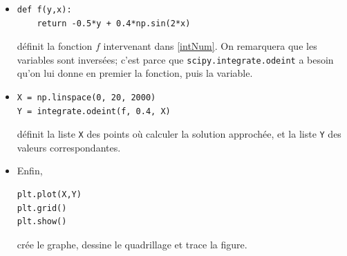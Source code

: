 \documentclass[../main.tex]{subfiles}
\begin{document}
\begin{exe}
\begin{itemize}
	\item \begin{verbatim}
def f(y,x):
    return -0.5*y + 0.4*np.sin(2*x)
	\end{verbatim}
	définit la fonction $f$ intervenant dans \eqref{intNum}. On remarquera que les variables sont inversées; c'est parce que \texttt{scipy.integrate.odeint} a besoin qu'on lui donne en premier la fonction, puis la variable.
	
	\item \begin{verbatim}
X = np.linspace(0, 20, 2000)
Y = integrate.odeint(f, 0.4, X)
	\end{verbatim}
	définit la liste \texttt{X} des points où calculer la solution approchée, et la liste \texttt{Y} des valeurs correspondantes.
	
	\item Enfin, \begin{verbatim}
plt.plot(X,Y)
plt.grid()
plt.show()
	\end{verbatim} 
	crée le graphe, dessine le quadrillage et trace la figure.
\end{itemize}
\end{exe}
\end{document}
